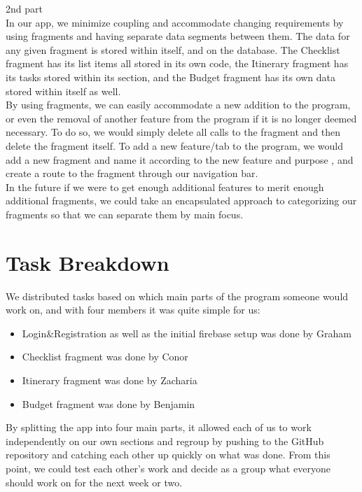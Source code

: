 \documentclass[12pt]{article}
\begin{document}
	2nd part\\

	In our app, we minimize coupling and accommodate changing requirements by using fragments and having separate data segments between them.
	The data for any given fragment is stored within itself, and on the database.
	The Checklist fragment has its list items all stored in its own code, the Itinerary fragment has its tasks stored within its section, and the Budget fragment has its own data stored within itself as well.\\


	By using fragments, we can easily accommodate a new addition to the program, or even the removal of another feature from the program if it is no longer deemed necessary.
	To do so, we would simply delete all calls to the fragment and then delete the fragment itself.
	To add a new feature/tab to the program, we would add a new fragment and name it according to the new feature and purpose , and create a route to the fragment through our navigation bar.\\


	In the future if we were to get enough additional features to merit enough additional fragments, we could take an encapsulated approach to categorizing our fragments so that we can separate them by main focus.


	\pagebreak
	\section*{Task Breakdown}
	We distributed tasks based on which main parts of the program someone would work on, and with four members it was quite simple for us:
	\begin{itemize}
		\item Login\&Registration as well as the initial firebase setup was done by Graham
		\item Checklist fragment was done by Conor
		\item Itinerary fragment was done by Zacharia
		\item Budget fragment was done by Benjamin
	\end{itemize}
	By splitting the app into four main parts, it allowed each of us to work independently on our own sections and regroup by pushing to the GitHub repository and catching each other up quickly on what was done.
	From this point, we could test each other's work and decide as a group what everyone should work on for the next week or two.
	
\end{document}
